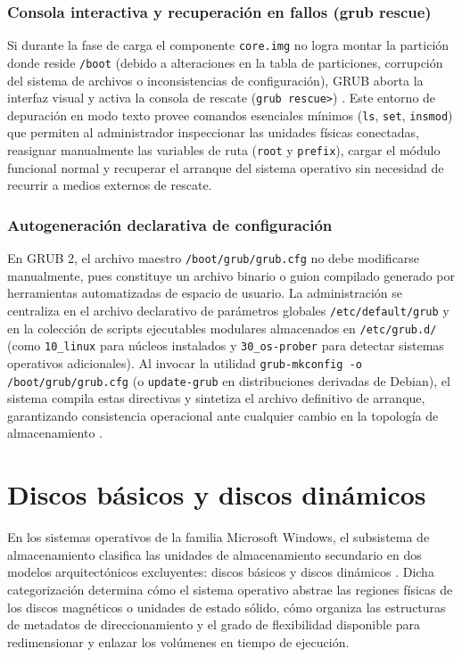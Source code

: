 \documentclass[12pt]{article}
\begin{document}
\subsubsection{Consola interactiva y recuperación en fallos (grub rescue)}

Si durante la fase de carga el componente \texttt{core.img} no logra montar la partición donde reside \texttt{/boot} (debido a alteraciones en la tabla de particiones, corrupción del sistema de archivos o inconsistencias de configuración), GRUB aborta la interfaz visual y activa la consola de rescate (\texttt{grub rescue>}) \parencite{gnugrub2024manual}. Este entorno de depuración en modo texto provee comandos esenciales mínimos (\texttt{ls}, \texttt{set}, \texttt{insmod}) que permiten al administrador inspeccionar las unidades físicas conectadas, reasignar manualmente las variables de ruta (\texttt{root} y \texttt{prefix}), cargar el módulo funcional normal y recuperar el arranque del sistema operativo sin necesidad de recurrir a medios externos de rescate.

\subsubsection{Autogeneración declarativa de configuración}

En GRUB 2, el archivo maestro \texttt{/boot/grub/grub.cfg} no debe modificarse manualmente, pues constituye un archivo binario o guion compilado generado por herramientas automatizadas de espacio de usuario. La administración se centraliza en el archivo declarativo de parámetros globales \texttt{/etc/default/grub} y en la colección de scripts ejecutables modulares almacenados en \texttt{/etc/grub.d/} (como \texttt{10\_linux} para núcleos instalados y \texttt{30\_os-prober} para detectar sistemas operativos adicionales). Al invocar la utilidad \texttt{grub-mkconfig -o /boot/grub/grub.cfg} (o \texttt{update-grub} en distribuciones derivadas de Debian), el sistema compila estas directivas y sintetiza el archivo definitivo de arranque, garantizando consistencia operacional ante cualquier cambio en la topología de almacenamiento \parencite{gnugrub2024manual}.

\section{Discos básicos y discos dinámicos}
\label{sec:discosBasicosDinamicos}

En los sistemas operativos de la familia Microsoft Windows, el subsistema de almacenamiento clasifica las unidades de almacenamiento secundario en dos modelos arquitectónicos excluyentes: discos básicos y discos dinámicos \parencite{microsoft2024basicdynamic}. Dicha categorización determina cómo el sistema operativo abstrae las regiones físicas de los discos magnéticos o unidades de estado sólido, cómo organiza las estructuras de metadatos de direccionamiento y el grado de flexibilidad disponible para redimensionar y enlazar los volúmenes en tiempo de ejecución.
\end{document}
